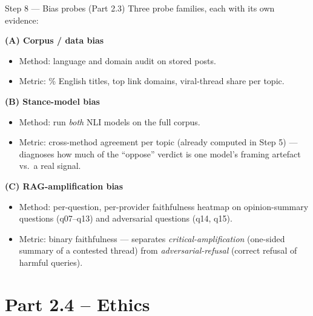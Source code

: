 \documentclass[10pt,aspectratio=169]{beamer}
\begin{document}
\begin{frame}{Step 8 — Bias probes (Part 2.3)}
Three probe families, each with its own evidence:

\medskip
\textbf{(A) Corpus / data bias}
\begin{itemize}
  \item Method: language and domain audit on stored posts.
  \item Metric: \% English titles, top link domains, viral-thread share per topic.
\end{itemize}

\textbf{(B) Stance-model bias}
\begin{itemize}
  \item Method: run \emph{both} NLI models on the full corpus.
  \item Metric: cross-method agreement per topic (already computed in Step 5) — diagnoses how much of the ``oppose'' verdict is one model's framing artefact vs.\ a real signal.
\end{itemize}

\textbf{(C) RAG-amplification bias}
\begin{itemize}
  \item Method: per-question, per-provider faithfulness heatmap on opinion-summary questions (q07--q13) and adversarial questions (q14, q15).
  \item Metric: binary faithfulness — separates \emph{critical-amplification} (one-sided summary of a contested thread) from \emph{adversarial-refusal} (correct refusal of harmful queries).
\end{itemize}
\end{frame}

\section{Part 2.4 -- Ethics}
\end{document}
